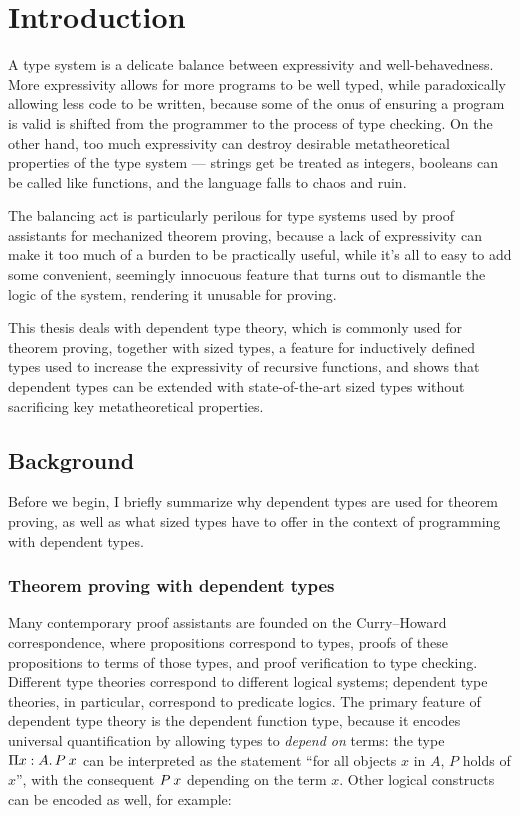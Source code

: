 \chapter{Introduction} \label{ch:introduction}

A type system is a delicate balance between expressivity and well-behavedness.
More expressivity allows for more programs to be well typed,
while paradoxically allowing less code to be written,
because some of the onus of ensuring a program is valid is shifted
from the programmer to the process of type checking.
On the other hand, too much expressivity can destroy
desirable metatheoretical properties of the type system ---
strings get be treated as integers, booleans can be called like functions,
and the language falls to chaos and ruin.

The balancing act is particularly perilous for type systems
used by proof assistants for mechanized theorem proving,
because a lack of expressivity can make it too much of a burden to be practically useful,
while it's all to easy to add some convenient, seemingly innocuous feature
that turns out to dismantle the logic of the system,
rendering it unusable for proving.

This thesis deals with dependent type theory, which is commonly used for theorem proving,
together with sized types, a feature for inductively defined types
used to increase the expressivity of recursive functions,
and shows that dependent types can be extended with state-of-the-art sized types
without sacrificing key metatheoretical properties.

\section{Background}

Before we begin, I briefly summarize why dependent types are used for theorem proving,
as well as what sized types have to offer in the context of programming with dependent types.

\subsection{Theorem proving with dependent types} \label{tt}

Many contemporary proof assistants are founded on the Curry--Howard correspondence,
where propositions correspond to types,
proofs of these propositions to terms of those types,
and proof verification to type checking.
Different type theories correspond to different logical systems;
dependent type theories, in particular, correspond to predicate logics.
The primary feature of dependent type theory is the dependent function type,
because it encodes universal quantification by allowing types to \emph{depend on} terms:
the type $\funtype{x}{A}{\app{P}{x}}$ can be interpreted as the statement
``for all objects $x$ in $A$, $P$ holds of $x$'',
with the consequent $\app{P}{x}$ depending on the term $x$.
Other logical constructs can be encoded as well, for example:

